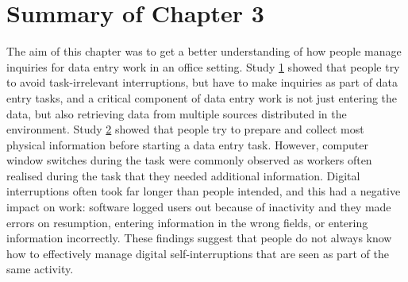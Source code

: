 \section{Summary of Chapter 3}
The aim of this chapter was to get a better understanding of how people manage inquiries for data entry work in an office setting. Study \hyperref[st:Study1]{1} showed that people try to avoid task-irrelevant interruptions, but have to make inquiries as part of data entry tasks, and a critical component of data entry work is not just entering the data, but also retrieving data from multiple sources distributed in the environment. Study \hyperref[st:Study2]{2} showed that people try to prepare and collect most physical information before starting a data entry task. However, computer window switches during the task were commonly observed as workers often realised during the task that they needed additional information. Digital interruptions often took far longer than people intended, and this had a negative impact on work: software logged users out because of inactivity and they made errors on resumption, entering information in the wrong fields, or entering information incorrectly. These findings suggest that people do not always know how to effectively manage digital self-interruptions that are seen as part of the same activity. 

